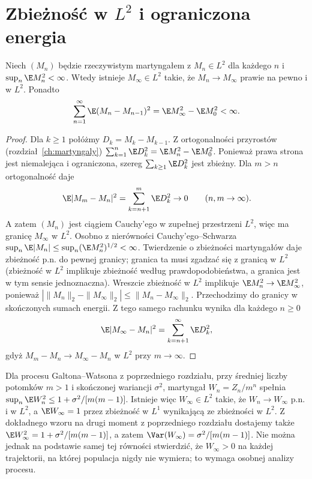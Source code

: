 \section{Zbieżność w \texorpdfstring{$L^2$}{L2} i ograniczona energia}

\begin{twierdzenie}
Niech $(M_n)$ będzie rzeczywistym martyngałem
z $M_n\in L^2$ dla każdego $n$
i $\sup_n\E M_n^2<\infty$. Wtedy istnieje
$M_\infty\in L^2$ takie, że
$M_n\to M_\infty$ prawie na pewno i w $L^2$.
Ponadto
\[
\sum_{n=1}^{\infty}\E(M_n-M_{n-1})^2
=\E M_\infty^2-\E M_0^2<\infty.
\]
\end{twierdzenie}
\begin{proof}
Dla $k\geq1$ połóżmy $D_k=M_k-M_{k-1}$.
Z ortogonalności przyrostów (rozdział~\ref{ch:martyngaly})
$\sum_{k=1}^n\E D_k^2
=\E M_n^2-\E M_0^2$.
Ponieważ prawa strona jest niemalejąca
i ograniczona, szereg $\sum_{k\geq1}\E D_k^2$
jest zbieżny. Dla $m>n$ ortogonalność daje
\[
\E|M_m-M_n|^2=\sum_{k=n+1}^m\E D_k^2\to0
\qquad(n,m\to\infty).
\]
A zatem $(M_n)$ jest ciągiem Cauchy'ego
w zupełnej przestrzeni $L^2$, więc ma granicę
$M_\infty$ w $L^2$. Osobno z nierówności
Cauchy'ego--Schwarza
$\sup_n\E|M_n|\leq\sup_n(\E M_n^2)^{1/2}<\infty$.
Twierdzenie o zbieżności martyngałów daje
zbieżność p.n. do pewnej granicy; granica ta
musi zgadzać się z granicą w $L^2$
(zbieżność w $L^2$ implikuje zbieżność według
prawdopodobieństwa, a granica jest w tym sensie
jednoznaczna). Wreszcie zbieżność w $L^2$
implikuje $\E M_n^2\to\E M_\infty^2$, ponieważ
$|\|M_n\|_2-\|M_\infty\|_2|\leq\|M_n-M_\infty\|_2$.
Przechodzimy do granicy w skończonych
sumach energii. Z tego samego rachunku wynika
dla każdego $n\geq0$
\[
\E|M_\infty-M_n|^2
=\sum_{k=n+1}^\infty \E D_k^2,
\]
gdyż $M_m-M_n\to M_\infty-M_n$ w $L^2$
przy $m\to\infty$.
\end{proof}

\begin{przyklad}
Dla procesu Galtona--Watsona z poprzedniego rozdziału,
przy średniej liczby potomków $m>1$ i
skończonej wariancji $\sigma^2$, martyngał
$W_n=Z_n/m^n$ spełnia
$\sup_n\E W_n^2\leq1+\sigma^2/[m(m-1)]$.
Istnieje więc $W_\infty\in L^2$ takie, że
$W_n\to W_\infty$ p.n. i w $L^2$, a
$\E W_\infty=1$ przez zbieżność w $L^1$
wynikającą ze zbieżności w $L^2$.
Z dokładnego wzoru na drugi moment z poprzedniego
rozdziału dostajemy także
$\E W_\infty^2=1+\sigma^2/[m(m-1)]$,
a zatem $\Var(W_\infty)=\sigma^2/[m(m-1)]$.
Nie można jednak na podstawie
samej tej równości stwierdzić, że
$W_\infty>0$ na każdej trajektorii,
na której populacja nigdy nie wymiera;
to wymaga osobnej analizy procesu.
\end{przyklad}

